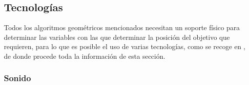 




\subsection{Tecnologías}

Todos los algoritmos geométricos mencionados necesitan un soporte físico para determinar las variables con las que determinar la posición del objetivo que requieren, para lo que es posible el uso de varias tecnologías, como se recoge en \cite{COMP}, de donde procede toda la información de esta sección.

\subsubsection{Sonido}

